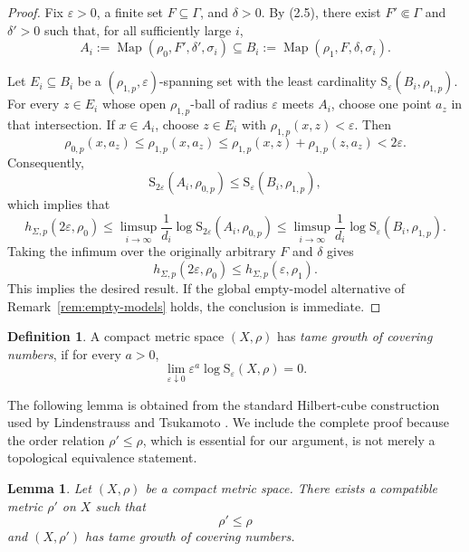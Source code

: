 \documentclass[12pt]{amsart}
\newtheorem{lemma}[theorem]{Lemma}
\theoremstyle{definition}
\newtheorem{definition}[theorem]{Definition}
\theoremstyle{remark}
\newcommand{\Map}{\operatorname{Map}}
\begin{document}
\begin{proof}
Fix $\varepsilon>0$, a finite set $F\subseteq\Gamma$, and $\delta>0$. By (2.5), there exist $F'\Subset\Gamma$ and $\delta'>0$ such that, for all sufficiently large $i$,
\[
 A_i:=\Map(\rho_0,F',\delta',\sigma_i)
 \subseteq
 B_i:=\Map(\rho_1,F,\delta,\sigma_i).
 \tag{3.1}
\]

Let $E_i\subseteq B_i$ be a $(\rho_{1,p},\varepsilon)$-spanning set  with the least cardinality $ \mathrm{S}_\varepsilon(B_i,\rho_{1,p})$. For every $z\in E_i$ whose open $\rho_{1,p}$-ball of radius $\varepsilon$ meets $A_i$, choose one point $a_z$ in that intersection. If $x\in A_i$, choose $z\in E_i$ with $\rho_{1,p}(x,z)<\varepsilon$. Then
\[
 \rho_{0,p}(x,a_z) \leq \rho_{1,p}(x,a_z)
 \leq \rho_{1,p}(x,z)+\rho_{1,p}(z,a_z)
 <2\varepsilon.
\]
Consequently,
\[
 \mathrm{S}_{2\varepsilon}(A_i,\rho_{0,p})
 \leq \mathrm{S}_\varepsilon(B_i,\rho_{1,p}),
 \tag{3.2}
\]
 which implies that
\[
 h_{\Sigma,p}(2\varepsilon,\rho_0) \leq \limsup_{i\to\infty}\frac1{d_i}
 \log \mathrm{S}_{2\varepsilon}(A_i,\rho_{0,p})
 \leq
 \limsup_{i\to\infty}\frac1{d_i}
 \log \mathrm{S}_\varepsilon(B_i,\rho_{1,p}).
\]
Taking the infimum over the originally arbitrary $F$ and $\delta$ gives
\[
 h_{\Sigma,p}(2\varepsilon,\rho_0)
 \leq h_{\Sigma,p}(\varepsilon,\rho_1).
 \tag{3.3}
\]
This implies the desired result.
If the global empty-model alternative of Remark~\ref{rem:empty-models} holds, the conclusion is immediate.
\end{proof}
\begin{definition}\label{def tame gowth}\cite[Definition 3.8]{LT}
A compact metric space $(X,\rho)$ has \emph{tame growth of covering numbers}, if for every $a>0$,
\[
 \lim_{\varepsilon\downarrow0}
 \varepsilon^a\log \mathrm{S}_\varepsilon(X,\rho)=0.
 \tag{3.4}
\]
\end{definition}

The following lemma is obtained from the standard Hilbert-cube construction used by Lindenstrauss and Tsukamoto \cite[Lemma 3.10]{LT}. We include the complete proof because the order relation $\rho'\leq\rho$, which is essential for our  argument, is not merely a topological equivalence statement.

\begin{lemma}\label{lem:tame-minorant}
Let $(X,\rho)$ be a compact metric space. There exists a compatible metric $\rho'$ on $X$ such that
\[
 \rho'\leq\rho
\]
and $(X,\rho')$ has tame growth of covering numbers.
\end{lemma}
\end{document}
